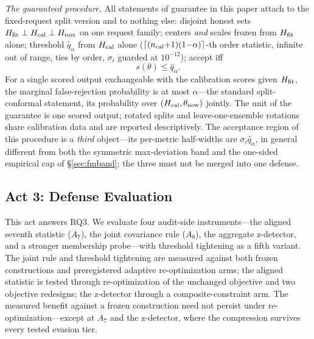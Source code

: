 \documentclass[lettersize,journal]{IEEEtran}
\begin{document}
\emph{The guaranteed procedure.} All
statements of guarantee in this paper attach to the fixed-request
split version and to nothing else:
disjoint honest sets $H_{\rm fit} \perp H_{\rm cal} \perp
H_{\rm test}$ on one request family; centers \emph{and} scales
frozen from $H_{\rm fit}$ alone; threshold $\hat q_\alpha$ from
$H_{\rm cal}$ alone ($\lceil (n_{\rm cal}{+}1)(1{-}\alpha) \rceil$-th
order statistic, infinite out of range, ties by order, $\sigma_i$
guarded at $10^{-12}$); accept iff
\begin{equation}
\label{eq:conf}
s(\theta) \le \hat q_\alpha.
\end{equation}
For a single scored output exchangeable with the calibration
scores given $H_{\rm fit}$, the marginal false-rejection
probability is at most $\alpha$---the standard split-conformal
statement, its probability over $(H_{\rm cal}, \theta_{\rm new})$
jointly. The unit of the guarantee is one scored output; rotated
splits and leave-one-ensemble rotations share calibration data and
are reported descriptively. The acceptance region of this procedure
is a \emph{third} object---its per-metric half-widths are
$\sigma_i \hat q_\alpha$, in general different from both the
symmetric max-deviation band and the one-sided empirical cap of
\S\ref{sec:fmband}; the three must not be merged into one defense.



\subsection{Act 3: Defense Evaluation}
\label{sec:mitigation}
This act answers RQ3. We evaluate four audit-side
instruments---the aligned seventh
statistic ($A_7$), the joint covariance rule ($A_8$), the
aggregate z-detector, and a stronger membership probe---with
threshold tightening as a fifth variant. The joint rule and
threshold tightening are measured against both frozen
constructions and preregistered adaptive re-optimization arms;
the aligned statistic is tested through re-optimization of the
unchanged objective and two objective redesigns; the
z-detector through a composite-constraint arm. The measured
benefit against a frozen construction need not persist under
re-optimization---except at $A_7$ and the z-detector, where
the compression survives every tested evasion tier.
\end{document}
